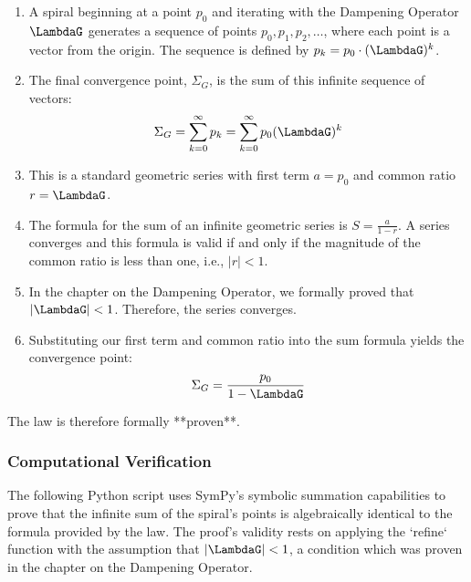 \begin{enumerate}
    \item A spiral beginning at a point $p_0$ and iterating with the Dampening Operator $\LambdaG$ generates a sequence of points $p_0, p_1, p_2, \dots$, where each point is a vector from the origin. The sequence is defined by $p_k = p_0 \cdot (\LambdaG)^k$.

    \item The final convergence point, $\Sigma_G$, is the sum of this infinite sequence of vectors:
    $$ \Sigma_G = \sum_{k=0}^{\infty} p_k = \sum_{k=0}^{\infty} p_0 (\LambdaG)^k $$

    \item This is a standard geometric series with first term $a = p_0$ and common ratio $r = \LambdaG$.

    \item The formula for the sum of an infinite geometric series is $S = \frac{a}{1-r}$. A series converges and this formula is valid if and only if the magnitude of the common ratio is less than one, i.e., $|r| < 1$.

    \item In the chapter on the Dampening Operator, we formally proved that $|\LambdaG| < 1$.  Therefore, the series converges.

    \item Substituting our first term and common ratio into the sum formula yields the convergence point:
    $$ \Sigma_G = \frac{p_0}{1 - \LambdaG} $$
\end{enumerate}
The law is therefore formally **proven**.

\subsubsection*{Computational Verification}
The following Python script uses SymPy's symbolic summation capabilities to prove that the infinite sum of the spiral's points is algebraically identical to the formula provided by the law. The proof's validity rests on applying the `refine` function with the assumption that $|\LambdaG|<1$, a condition which was proven in the chapter on the Dampening Operator. 

